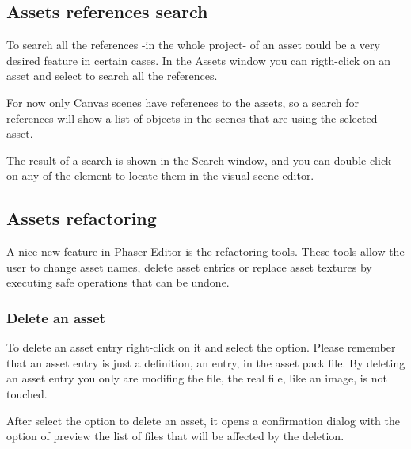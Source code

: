 \documentclass[letterpaper,10pt,english]{sphinxmanual}
\begin{document}
\subsection{Assets references search}
\label{\detokenize{assets_manager:assets-references-search}}
To search all the references -in the whole project- of an asset could be a very desired feature in certain cases. In the Assets window you can rigth-click on an asset and select to search all the references.

\noindent{}

For now only Canvas scenes have references to the assets, so a search for references will show a list of objects in the scenes that are using the selected asset.

The result of  a search is shown in the Search window, and you can double click on any of the element to locate them in the visual scene editor.

\noindent{}


\subsection{Assets refactoring}
\label{\detokenize{assets_manager:assets-refactoring}}
A nice new feature in Phaser Editor is the refactoring tools. These tools allow the user to change asset names, delete asset entries or replace asset textures by executing safe operations that can be undone.


\subsubsection{Delete an asset}
\label{\detokenize{assets_manager:delete-an-asset}}
To delete an asset entry right-click on it and select the  option.  Please remember that an asset entry is just a definition, an entry, in the asset pack file. By deleting an asset entry you only are modifing the  file, the real file, like an image, is not touched.

\noindent{}


After select the option to delete an asset, it opens a confirmation dialog with the option of preview the list of files that will be affected by the deletion.
\end{document}
